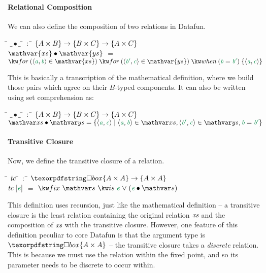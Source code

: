\paragraph{Relational Composition}
We can also define the composition of two relations in Datafun.
\begin{tabbing}
  \qquad\=\+ \kill
  $\_ \bullet \_$ \quad\:\= $\,:$\;\; \=
  $ \{{A \times B}\} \to \{{B \times C}\} \to \{{A \times C}\}$ \\

  $\mathvar{xs} \bullet \mathvar{ys}$
  \> $=$ \> $\eforraw{\etuple{\dvar a,\dvar b} \in \mathvar{xs}}
  \eforraw{\etuple{\dvar{b'}, \dvar c} \in \mathvar{ys}}
  \ewhen{\dvar b = \dvar{b'}} \esetraw{\etuple{\dvar a,\dvar c}}
  $
\end{tabbing}
This is basically a transcription of the mathematical definition, where we build
those pairs which agree on their $B$-typed components. It can also be written using
set comprehension as:
\begin{tabbing}
  \qquad\=\+ \kill
  $\_ \bullet \_$ \;\;\;\= $\,:$\;\; \=
  $ \{{A \times B}\} \to \{{B \times C}\} \to \{{A \times C}\}$ \\

  $\var{xs} \bullet \var{ys} =
  \setfor{\etuple{\dvar a, \dvar c}}{
    \etuple{\dvar a, \dvar b} \in \var{xs},
    \etuple{\dvar{b'}, \dvar c} \in \var{ys}, \dvar b = \dvar{b'}}$
\end{tabbing}

\paragraph{Transitive Closure}\label{sec:generic-transitive-closure}
Now, we define the transitive closure of a relation.
\begin{tabbing}
  \qquad\=\+ \kill
  $\text{\itshape tc}$ \quad\: \= $\,:$ \;\;\= $\iso{\tset{A \times A}} \to \tset{A \times A}$ \\
  $\name{tc}\;\eboxvar{e}$ \> $=$ \>
  $\efixis{\var{s}}{\dvar{e} \vee (\dvar{e} \bullet \var{s})}$
\end{tabbing}

This definition uses recursion, just like the mathematical definition --
a transitive closure is the least relation containing the original relation $\text{\itshape xs}$
and the composition of $\text{\itshape xs}$ with the transitive closure. However, one
feature of this definition peculiar to core Datafun is that the argument type
is $\iso \tset{A \times A}$ -- the transitive closure takes a \emph{discrete} relation.
This is because we must use the relation within the fixed point, and so its parameter needs
to be discrete to occur within.


